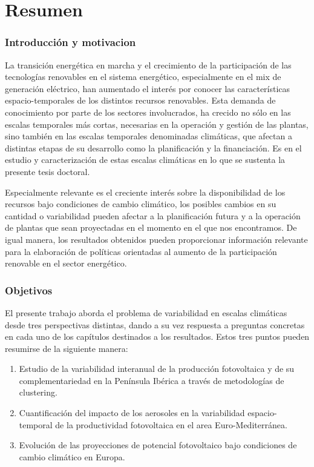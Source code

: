 \chapter*{Resumen\label{cha:resumen}}

\subsection{Introducci\'on y motivacion}

La transición energética en marcha y el crecimiento de la participación de las tecnologías renovables en el sistema energético, especialmente en el mix de generación eléctrico, han aumentado el interés por conocer las características espacio-temporales de los distintos recursos renovables. Esta demanda de conocimiento por parte de los sectores involucrados, ha crecido no sólo en las escalas temporales más cortas, necesarias en la operación y gestión de las plantas, sino también en las escalas temporales denominadas climáticas, que afectan a distintas etapas de su desarrollo como la planificación y la financiación. Es en el estudio y caracterización de estas escalas climáticas en lo que se sustenta la presente tesis doctoral.

Especialmente relevante es el creciente interés sobre la disponibilidad de los recursos bajo condiciones de cambio climático, los posibles cambios en su cantidad o variabilidad pueden afectar a la planificación futura y a la operación de plantas que sean proyectadas en el momento en el que nos encontramos. De igual manera, los resultados obtenidos pueden proporcionar información relevante para la elaboración de políticas orientadas al aumento de la participación renovable en el sector energético.

\subsection{Objetivos}

El presente trabajo aborda el problema de variabilidad en escalas climáticas desde tres perspectivas distintas, dando a su vez respuesta a preguntas concretas en cada uno de los capítulos destinados a los resultados. Estos tres puntos pueden resumirse de la siguiente manera:

\begin{enumerate}
\item Estudio de la variabilidad interanual de la producción fotovoltaica y de su complementariedad en la Península Ibérica a través de metodologías de clustering.
\item Cuantificación del impacto de los aerosoles en la variabilidad espacio-temporal de la productividad fotovoltaica en el area Euro-Mediterránea.
\item Evolución de las proyecciones de potencial fotovoltaico bajo condiciones de cambio climático en Europa.
\end{enumerate}

